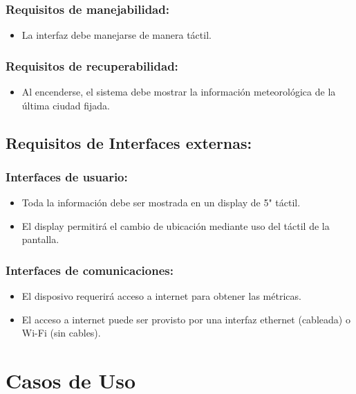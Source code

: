 \subsubsection{Requisitos de manejabilidad:}
\begin{itemize}
    \item La interfaz debe manejarse de manera táctil.
\end{itemize}

\subsubsection{Requisitos de recuperabilidad:}
\begin{itemize}
    \item Al encenderse, el sistema debe mostrar la información meteorológica de la
    última ciudad fijada.
\end{itemize}

\subsection{Requisitos de Interfaces externas:}

\subsubsection{Interfaces de usuario:}
\begin{itemize}
    \item Toda la información debe ser mostrada en un display de 5" táctil.
    \item El display permitirá el cambio de ubicación mediante uso del táctil de la pantalla.
\end{itemize}

\subsubsection{Interfaces de comunicaciones:}
\begin{itemize}
    \item El disposivo requerirá acceso a internet para obtener las métricas.
    \item El acceso a internet puede ser provisto por una interfaz ethernet (cableada)
    o Wi-Fi (sin cables).
\end{itemize}

\section{Casos de Uso}

